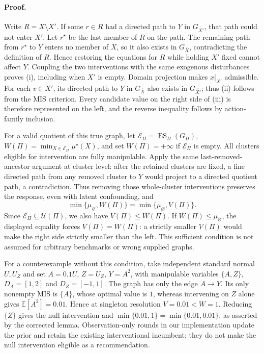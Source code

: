 \paragraph{Proof.}
Write $R=X\setminus X'$. If some $r\in R$ had a directed path to $Y$
in $G_{\overline {X'}}$, that path could not enter $X'$. Let $r^\star$
be the last member of $R$ on the path. The remaining path from $r^\star$
to $Y$ enters no member of $X$, so it also exists in $G_{\overline X}$,
contradicting the definition of $R$. Hence restoring the equations for
$R$ while holding $X'$ fixed cannot affect $Y$. Coupling the two
interventions with the same exogenous disturbances proves (i), including
when $X'$ is empty. Domain projection makes $x|_{X'}$ admissible.
For each $v\in X'$, its directed path to $Y$ in $G_{\overline X}$ also
exists in $G_{\overline {X'}}$; thus (ii) follows from the MIS criterion.
Every candidate value on the right side of (iii) is therefore represented
on the left, and the reverse inequality follows by action-family inclusion.

For a valid quotient of this true graph, let
$\mathcal E_\Pi=\operatorname{ES}_\Pi(G_\Pi)$,
$W(\Pi)=\min_{X\in\mathcal E_\Pi}\mu^\star(X)$, and set
$W(\Pi)=+\infty$ if $\mathcal E_\Pi$ is empty. All clusters eligible for
intervention are fully manipulable. Apply the same last-removed-ancestor
argument at cluster level: after the retained clusters are fixed, a
fine directed path from any removed cluster to $Y$ would project to a
directed quotient path, a contradiction. Thus removing those whole-cluster
interventions preserves the response, even with latent confounding, and
\[
 \min\{\mu_{\varnothing},W(\Pi)\}
 =\min\{\mu_{\varnothing},V(\Pi)\}.
\]
Since $\mathcal E_\Pi\subseteq\mathcal U(\Pi)$, we also have
$V(\Pi)\le W(\Pi)$. If $W(\Pi)\le\mu_{\varnothing}$, the displayed
equality forces $V(\Pi)=W(\Pi)$: a strictly smaller $V(\Pi)$ would make
the right side strictly smaller than the left. This sufficient condition
is not assumed for arbitrary benchmarks or wrong supplied graphs.

For a counterexample without this condition, take independent standard
normal $U,U_Z$ and set $A=0.1U$, $Z=U_Z$, $Y=A^2$, with manipulable
variables $\{A,Z\}$, $D_A=[1,2]$ and $D_Z=[-1,1]$.
The graph has only the edge $A\to Y$. Its only nonempty MIS is $\{A\}$,
whose optimal value is $1$, whereas intervening on $Z$ alone gives
$\mathbb E[A^2]=0.01$. Hence at singleton resolution
$V=0.01<W=1$. Reducing $\{Z\}$ gives the null intervention and
$\min\{0.01,1\}=\min\{0.01,0.01\}$, as asserted by the corrected lemma.
Observation-only rounds in our implementation update the prior and retain
the existing interventional incumbent; they do not make the null
intervention eligible as a recommendation.

